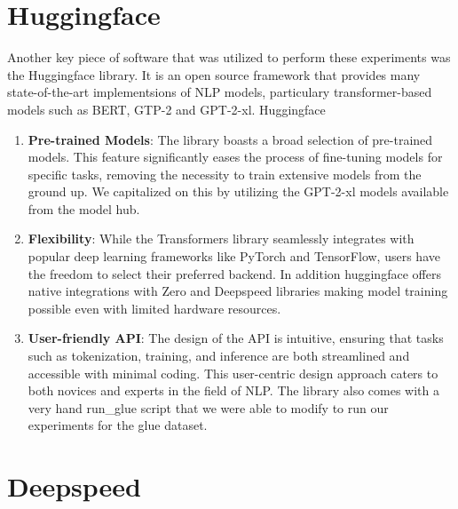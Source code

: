 \documentclass[\main/thesis.tex]{subfiles}
\begin{document}
\section{Huggingface}\label{sec:huggingface}
Another key piece of software that was utilized to perform these experiments was the Huggingface\cite{wolf_transformers_2020} library. It is 
an open source framework that provides many state-of-the-art implementsions of NLP models, particulary transformer-based models such as BERT, GTP-2 
and GPT-2-xl. Huggingface 

\begin{enumerate}
    \item \textbf{Pre-trained Models}: The library boasts a broad selection of pre-trained models. This feature significantly eases the 
    process of fine-tuning models for specific tasks, removing the necessity to train extensive models from the ground up. We capitalized on this 
    by utilizing the GPT-2-xl models available from the model hub. 
    
    \item \textbf{Flexibility}: While the Transformers library seamlessly integrates with popular deep learning frameworks like 
    PyTorch and TensorFlow, users have the freedom to select their preferred backend. In addition huggingface offers native integrations with 
    Zero and Deepspeed libraries making model training possible even with limited hardware resources. 
    
    \item \textbf{User-friendly API}: The design of the API is intuitive, ensuring that tasks such as tokenization, 
    training, and inference are both streamlined and accessible with minimal coding. This user-centric design approach caters to 
    both novices and experts in the field of NLP. The library also comes with a very hand run\_glue script that we were able to modify to 
    run our experiments for the glue dataset.

\end{enumerate}


\section{Deepspeed}\label{sec:deepspeed}
\end{document}

